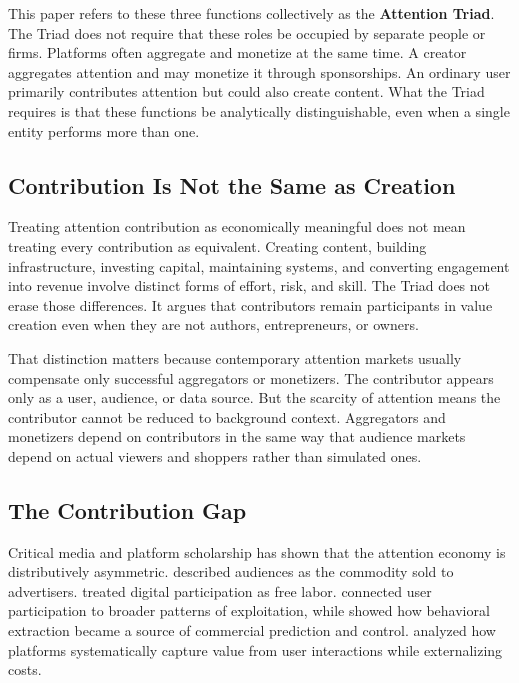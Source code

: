 \documentclass[12pt, a4paper]{article}
\begin{document}
This paper refers to these three functions collectively as the \textbf{Attention Triad}. The Triad does not require that these roles be occupied by separate people or firms. Platforms often aggregate and monetize at the same time. A creator aggregates attention and may monetize it through sponsorships. An ordinary user primarily contributes attention but could also create content. What the Triad requires is that these functions be analytically distinguishable, even when a single entity performs more than one.

\subsection{Contribution Is Not the Same as Creation}
\label{sec:triad-distinction}

Treating attention contribution as economically meaningful does not mean treating every contribution as equivalent. Creating content, building infrastructure, investing capital, maintaining systems, and converting engagement into revenue involve distinct forms of effort, risk, and skill. The Triad does not erase those differences. It argues that contributors remain participants in value creation even when they are not authors, entrepreneurs, or owners.

That distinction matters because contemporary attention markets usually compensate only successful aggregators or monetizers. The contributor appears only as a user, audience, or data source. But the scarcity of attention means the contributor cannot be reduced to background context. Aggregators and monetizers depend on contributors in the same way that audience markets depend on actual viewers and shoppers rather than simulated ones.

\subsection{The Contribution Gap}
\label{sec:triad-gap}

Critical media and platform scholarship has shown that the attention economy is distributively asymmetric. \citet{smythe1977} described audiences as the commodity sold to advertisers. \citet{terranova2000, terranova2012} treated digital participation as free labor. \citet{fuchs2014} connected user participation to broader patterns of exploitation, while \citet{zuboff2019} showed how behavioral extraction became a source of commercial prediction and control. \citet{srnicek2017} analyzed how platforms systematically capture value from user interactions while externalizing costs.
\end{document}
